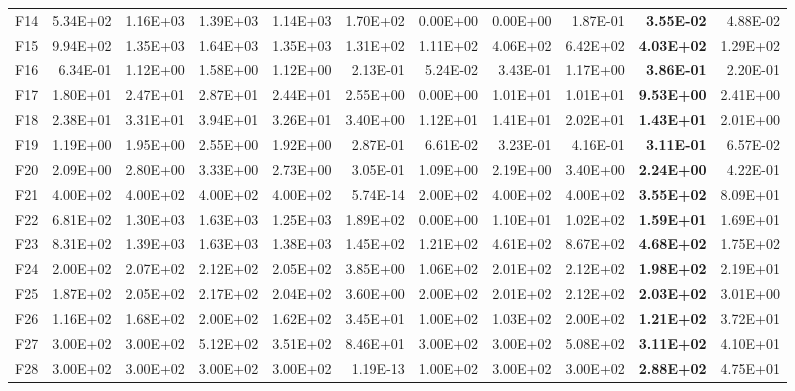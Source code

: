 \begin{tabular}{lrrrrrrrrrr}
F14 & 5.34E+02 & 1.16E+03 & 1.39E+03 & 1.14E+03 & 1.70E+02 & 0.00E+00 & 0.00E+00 & 1.87E-01 & \textbf{3.55E-02} & 4.88E-02 \\
F15 & 9.94E+02 & 1.35E+03 & 1.64E+03 & 1.35E+03 & 1.31E+02 & 1.11E+02 & 4.06E+02 & 6.42E+02 & \textbf{4.03E+02} & 1.29E+02 \\
F16 & 6.34E-01 & 1.12E+00 & 1.58E+00 & 1.12E+00 & 2.13E-01 & 5.24E-02 & 3.43E-01 & 1.17E+00 & \textbf{3.86E-01} & 2.20E-01 \\
F17 & 1.80E+01 & 2.47E+01 & 2.87E+01 & 2.44E+01 & 2.55E+00 & 0.00E+00 & 1.01E+01 & 1.01E+01 & \textbf{9.53E+00} & 2.41E+00 \\
F18 & 2.38E+01 & 3.31E+01 & 3.94E+01 & 3.26E+01 & 3.40E+00 & 1.12E+01 & 1.41E+01 & 2.02E+01 & \textbf{1.43E+01} & 2.01E+00 \\
F19 & 1.19E+00 & 1.95E+00 & 2.55E+00 & 1.92E+00 & 2.87E-01 & 6.61E-02 & 3.23E-01 & 4.16E-01 & \textbf{3.11E-01} & 6.57E-02 \\
F20 & 2.09E+00 & 2.80E+00 & 3.33E+00 & 2.73E+00 & 3.05E-01 & 1.09E+00 & 2.19E+00 & 3.40E+00 & \textbf{2.24E+00} & 4.22E-01 \\
F21 & 4.00E+02 & 4.00E+02 & 4.00E+02 & 4.00E+02 & 5.74E-14 & 2.00E+02 & 4.00E+02 & 4.00E+02 & \textbf{3.55E+02} & 8.09E+01 \\
F22 & 6.81E+02 & 1.30E+03 & 1.63E+03 & 1.25E+03 & 1.89E+02 & 0.00E+00 & 1.10E+01 & 1.02E+02 & \textbf{1.59E+01} & 1.69E+01 \\
F23 & 8.31E+02 & 1.39E+03 & 1.63E+03 & 1.38E+03 & 1.45E+02 & 1.21E+02 & 4.61E+02 & 8.67E+02 & \textbf{4.68E+02} & 1.75E+02 \\
F24 & 2.00E+02 & 2.07E+02 & 2.12E+02 & 2.05E+02 & 3.85E+00 & 1.06E+02 & 2.01E+02 & 2.12E+02 & \textbf{1.98E+02} & 2.19E+01 \\
F25 & 1.87E+02 & 2.05E+02 & 2.17E+02 & 2.04E+02 & 3.60E+00 & 2.00E+02 & 2.01E+02 & 2.12E+02 & \textbf{2.03E+02} & 3.01E+00 \\
F26 & 1.16E+02 & 1.68E+02 & 2.00E+02 & 1.62E+02 & 3.45E+01 & 1.00E+02 & 1.03E+02 & 2.00E+02 & \textbf{1.21E+02} & 3.72E+01 \\
F27 & 3.00E+02 & 3.00E+02 & 5.12E+02 & 3.51E+02 & 8.46E+01 & 3.00E+02 & 3.00E+02 & 5.08E+02 & \textbf{3.11E+02} & 4.10E+01 \\
F28 & 3.00E+02 & 3.00E+02 & 3.00E+02 & 3.00E+02 & 1.19E-13 & 1.00E+02 & 3.00E+02 & 3.00E+02 & \textbf{2.88E+02} & 4.75E+01 \\
\bottomrule
\end{tabular}

